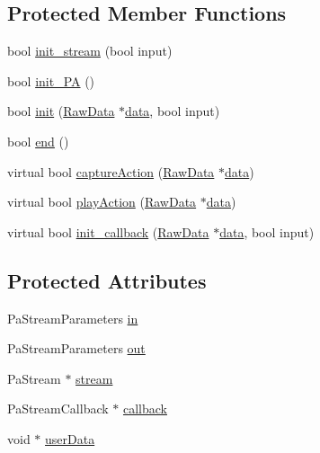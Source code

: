 \subsection*{Protected Member Functions}
\begin{DoxyCompactItemize}
\item 
bool \hyperlink{class_capture_ae88010511b90a237a8a17ad2a70e5432}{init\+\_\+stream} (bool input)
\item 
bool \hyperlink{class_capture_ae3ad177c3bd753d8ec633ac545f9b929}{init\+\_\+\+P\+A} ()
\item 
bool \hyperlink{class_capture_a30365cdef1c06d2e1f8cf7abba00b21f}{init} (\hyperlink{class_raw_data}{Raw\+Data} $\ast$\hyperlink{readwave_8h_aa12fa7025612e5f4774f2412dd7f465b}{data}, bool input)
\item 
bool \hyperlink{class_capture_a3ed2fabc0ab88e8b0dd9dc8b108cf0fb}{end} ()
\item 
virtual bool \hyperlink{class_capture_afbd312bfcb81305f9bc542c56e83d64c}{capture\+Action} (\hyperlink{class_raw_data}{Raw\+Data} $\ast$\hyperlink{readwave_8h_aa12fa7025612e5f4774f2412dd7f465b}{data})
\item 
virtual bool \hyperlink{class_capture_a4dea1091e735509dd97e0b14e054f77f}{play\+Action} (\hyperlink{class_raw_data}{Raw\+Data} $\ast$\hyperlink{readwave_8h_aa12fa7025612e5f4774f2412dd7f465b}{data})
\item 
virtual bool \hyperlink{class_capture_a646039c1a6c861683f547dd894ef4b27}{init\+\_\+callback} (\hyperlink{class_raw_data}{Raw\+Data} $\ast$\hyperlink{readwave_8h_aa12fa7025612e5f4774f2412dd7f465b}{data}, bool input)
\end{DoxyCompactItemize}
\subsection*{Protected Attributes}
\begin{DoxyCompactItemize}
\item 
Pa\+Stream\+Parameters \hyperlink{class_capture_a84320acc014a2d81574a876e6d693108}{in}
\item 
Pa\+Stream\+Parameters \hyperlink{class_capture_ad9e4da58dead277ef3b387fd4080d12b}{out}
\item 
Pa\+Stream $\ast$ \hyperlink{class_capture_abc592c61bc547b65c395b8a43c5cf1ad}{stream}
\item 
Pa\+Stream\+Callback $\ast$ \hyperlink{class_capture_a8011f682b8e253387a717134b454c2d4}{callback}
\item 
void $\ast$ \hyperlink{class_capture_a0253ca7959f1e3a550502c33612e3c2e}{user\+Data}
\end{DoxyCompactItemize}


